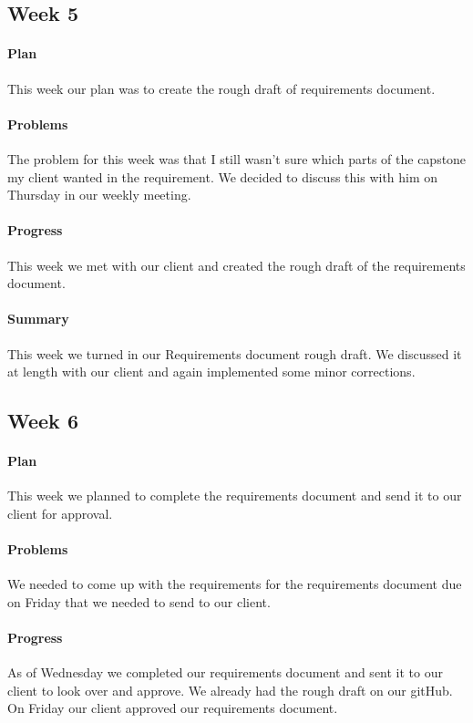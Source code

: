 \documentclass[onecolumn, draftclsnofoot,10pt, compsoc]{IEEEtran}
\begin{document}
\subsection{Week 5}
\paragraph{Plan}
This week our plan was to create the rough draft of requirements document.
\paragraph{Problems}
The problem for this week was that I still wasn't sure which parts of the capstone my client wanted in the requirement. We decided to discuss this with him on Thursday in our weekly meeting.
\paragraph{Progress}
This week we met with our client and created the rough draft of the requirements document.
\paragraph{Summary}
This week we turned in our Requirements document rough draft. We discussed it at length with our client and again implemented some minor corrections.

\subsection{Week 6}
\paragraph{Plan}
This week we planned to complete the requirements document and send it to our client for approval.
\paragraph{Problems}
We needed to come up with the requirements for the requirements document due on Friday that we needed to send to our client.
\paragraph{Progress}
As of Wednesday we completed our requirements document and sent it to our client to look over and approve. We already had the rough draft on our gitHub. On Friday our client approved our requirements document.
\end{document}
